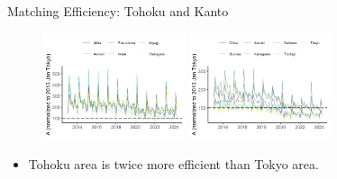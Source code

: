 \documentclass[aspectratio=169]{beamer}
\begin{document}
\begin{frame}{Matching Efficiency: Tohoku and Kanto}
\begin{figure}[!ht]
  \begin{center}

  \includegraphics[width = 0.37\textwidth]
  {figuretable/matching_efficiency_month_aggregate_tohoku.png}
  \includegraphics[width = 0.37\textwidth]
  {figuretable/matching_efficiency_month_aggregate_kanto.png}
  \end{center}
  \footnotesize
\end{figure} 
\begin{itemize}
    \item Tohoku area is twice more efficient than Tokyo area.
\end{itemize}
\end{frame}
\end{document}
